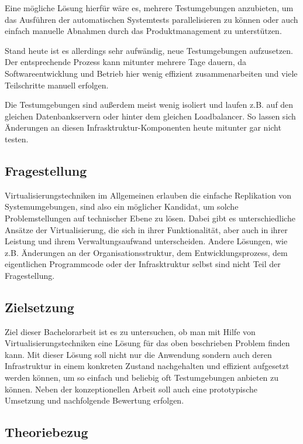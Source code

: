 Eine mögliche Lösung hierfür wäre es, mehrere Testumgebungen anzubieten, um das Ausführen der automatischen Systemtests parallelisieren zu können oder auch einfach manuelle Abnahmen durch das Produktmanagement zu unterstützen.

Stand heute ist es allerdings sehr aufwändig, neue Testumgebungen aufzusetzen. Der entsprechende Prozess kann mitunter mehrere Tage dauern, da Softwareentwicklung und Betrieb hier wenig effizient zusammenarbeiten und viele Teilschritte manuell erfolgen.

Die Testumgebungen sind außerdem meist wenig isoliert und laufen z.B. auf den gleichen Datenbankservern oder hinter dem gleichen Loadbalancer. So lassen sich Änderungen an diesen Infrasktruktur-Komponenten heute mitunter gar nicht testen.

\subsection{Fragestellung}

Virtualisierungstechniken im Allgemeinen erlauben die einfache Replikation von Systemumgebungen, sind also ein möglicher Kandidat, um solche Problemstellungen auf technischer Ebene zu lösen. Dabei gibt es unterschiedliche Ansätze der Virtualisierung, die sich in ihrer Funktionalität, aber auch in ihrer Leistung und ihrem Verwaltungsaufwand unterscheiden. Andere Lösungen, wie z.B. Änderungen an der Organisationsstruktur, dem Entwicklungsprozess, dem eigentlichen Programmcode oder der Infrasktruktur selbst sind nicht Teil der Fragestellung.

\subsection{Zielsetzung}

Ziel dieser Bachelorarbeit ist es zu untersuchen, ob man mit Hilfe von Virtualisierungstechniken eine Lösung für das oben beschrieben Problem finden kann. Mit dieser Lösung soll nicht nur die Anwendung sondern auch deren Infrastruktur in einem konkreten Zustand nachgehalten und effizient aufgesetzt werden können, um so einfach und beliebig oft Testumgebungen anbieten zu können. Neben der konzeptionellen Arbeit soll auch eine prototypische Umsetzung und nachfolgende Bewertung erfolgen.

\subsection{Theoriebezug}

